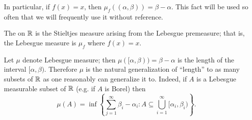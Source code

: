 \begin{subsec}
In particular, if $f(x) = x$, then $\mu_f((\alpha, \beta)) = \beta - \alpha$.
This fact will be used so often that we will frequently use it without reference.
\end{subsec}

\begin{definition}
The  on $\mathbb{R}$ is the Stieltjes measure arising from the Lebesgue premeasure; that is, the Lebesgue measure is $\mu_f$ where $f(x) = x$.
\end{definition}

\begin{subsec}
Let $\mu$ denote Lebesgue measure; then $\mu([\alpha, \beta)) = \beta - \alpha$ is the length of the interval $[\alpha, \beta)$.
Therefore $\mu$ is the natural generalization of ``length'' to as many subsets of $\mathbb{R}$ as one reasonably can generalize it to.
Indeed, if $A$ is a Lebesgue measurable subset of $\mathbb{R}$ (e.g. if $A$ is Borel) then
\begin{equation}
\label{lebesgue measure formula}
\mu(A) = \inf \left\{\sum_{j=1}^{\infty} \beta_{i} - \alpha_i: A \subseteq \bigcup_{i=1}^{\infty} [\alpha_i, \beta_i)\right\}.
\end{equation}
\end{subsec}


